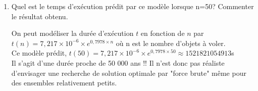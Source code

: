 \documentclass[12pt,french]{article}
\begin{document}
\begin{enumerate}
	\item Quel est le temps d'exécution prédit par ce modèle lorsque n=50? Commenter le résultat obtenu.
	
\begin{tcolorbox}[enhanced,attach boxed title to top center={yshift=-3mm,yshifttext=-1mm},
	colback=blue!5!white,colframe=blue!75!black,colbacktitle=blue!25!black,
	title=solution :, fonttitle=\bfseries,
	boxed title style={size=small,colframe=green!25!black} ]
	
	On peut modéliser la durée d'exécution $t$ en fonction de $n$ par $t(n)=7,217\times 10^{-6} \times e^{0,7978\times n}$  où n est le nombre d'objets à voler. \\
	Ce modèle prédit, $t(50)=7,217\times 10^{-6} \times e^{0,7978\times 50} \approx 1521821054913  $s \\
	Il s'agit d'une durée proche de 50 000 ans !! Il n'est donc pas réaliste d'envisager une recherche de solution optimale par "force brute" même pour des ensembles relativement petits.	
		\end{tcolorbox}
\end{enumerate}	
\end{document}
